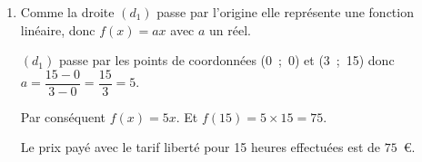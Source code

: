 \begin{enumerate}
\item  Comme la droite $\left(d_1\right)$ passe par l'origine elle représente une fonction linéaire, donc $f(x) = ax$ avec $a$ un réel.

$\left(d_1\right)$ passe par les points de coordonnées (0~;~0) et (3~;~15) donc
$a = \dfrac{15-0}{3 - 0} =  \dfrac{15}{3} = 5$.

Par conséquent $f(x) = 5x$. Et $f(15) = 5 \times 15 = 75$.

Le prix payé avec le tarif \og liberté\fg{} pour 15 heures effectuées est de $75$~\euro.
\end{enumerate}

\bigskip

